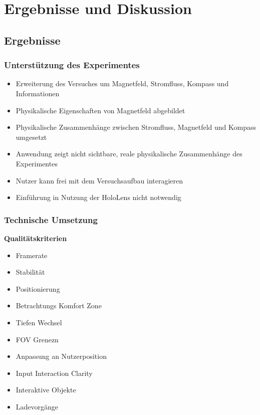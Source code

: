 \section{Ergebnisse und Diskussion}
\label{sec-6}

\subsection{Ergebnisse}

\subsubsection{Unterstützung des Experimentes}
\begin{itemize}
	\item Erweiterung des Versuches um Magnetfeld, Stromfluss, Kompass und Informationen
	\item Physikalische Eigenschaften von Magnetfeld abgebildet
	\item Physikalische Zusammenhänge zwischen Stromfluss, Magnetfeld und Kompass umgesetzt
	\item Anwendung zeigt nicht sichtbare, reale physikalische Zusammenhänge des Experimentes
	\item Nutzer kann frei mit dem Versuchsaufbau interagieren
	\item Einführung in Nutzung der HoloLens nicht notwendig
\end{itemize}

\subsubsection{Technische Umsetzung}
\textbf{Qualitätskriterien}
\begin{itemize}
	\item Framerate
	\item Stabilität
	\item Positionierung
	\item Betrachtungs Komfort Zone
	\item Tiefen Wechsel
	\item FOV Grenezn
	\item Anpassung an Nutzerposition
	\item Input Interaction Clarity
	\item Interaktive Objekte
	\item Ladevorgänge
\end{itemize}

